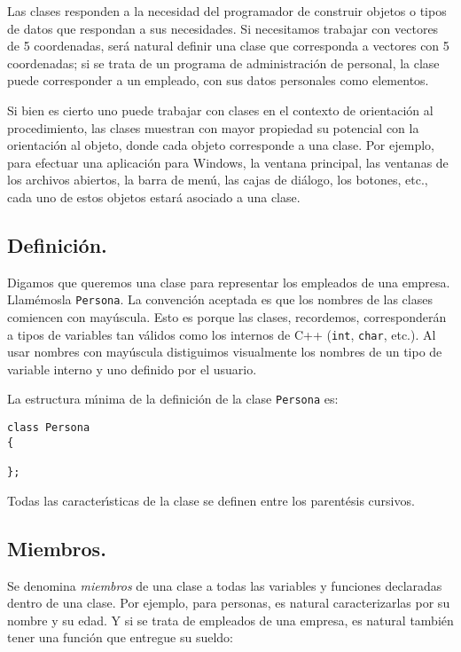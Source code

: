 Las clases responden a la necesidad del programador de construir
objetos o tipos de datos que respondan a sus necesidades. Si
necesitamos trabajar con vectores de 5 coordenadas, ser{\'a} natural
definir una clase que corresponda a vectores con 5 coordenadas; si se
trata de un programa de administraci{\'o}n de personal, la clase puede
corresponder a un empleado, con sus datos personales como elementos.

Si bien es cierto uno puede trabajar con clases en el contexto de
orientaci{\'o}n al procedimiento, las clases muestran con mayor
propiedad su potencial con la orientaci{\'o}n al objeto, donde cada
objeto corresponde a una clase. Por ejemplo, para efectuar una
aplicaci{\'o}n para Windows, la ventana principal, las ventanas de los
archivos abiertos, la barra de men{\'u}, las cajas de di{\'a}logo, los
botones, etc., cada uno de estos objetos estar{\'a} asociado a una
clase. 

\subsection{Definici{\'o}n.}

Digamos que queremos una clase para representar los empleados de una
empresa. Llam{\'e}mosla \verb+Persona+. La convenci{\'o}n aceptada es que
los nombres de las clases comiencen con may{\'u}scula. Esto es porque
las clases, recordemos, corresponder{\'a}n a tipos de variables tan
v{\'a}lidos como los internos de C++ (\verb+int+, \verb+char+, etc.).
Al usar nombres con may{\'u}scula distiguimos visualmente los nombres
de un tipo de variable interno y uno definido por el usuario.

La estructura m\'{\i}nima de la definici{\'o}n de la clase
\verb+Persona+ es:
\begin{verbatim}
class Persona
{

};
\end{verbatim}

Todas las caracter\'{\i}sticas de la clase se definen entre los
parent{\'e}sis cursivos.

\subsection{Miembros.}

Se denomina {\em miembros\/} de una clase a todas las variables y
funciones declaradas dentro de una clase. Por ejemplo, para personas,
es natural caracterizarlas por su nombre y su edad. Y si se trata de
empleados de una empresa, es natural tambi{\'e}n tener una funci{\'o}n
que entregue su sueldo:

